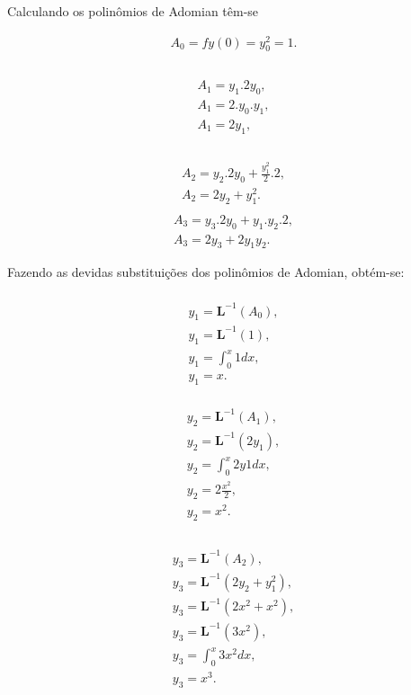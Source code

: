 Calculando os polinômios de Adomian têm-se

\begin{gather*}
  A_{0} = fy(0) = y_{0}^2 = 1.
\end{gather*}
\nonumber\\
\begin{gather*}\nonumber\\
  A_{1} = y_{1}.2y_{0}, \nonumber\\
  A_{1} = 2.y_{0}.y_{1},\nonumber\\
  A_{1} = 2y_{1},\nonumber\\
\end{gather*}\nonumber\\
\begin{gather*}
A_{2} = y_{2}.2y_{0} + \frac{y_{1}^{2}}{2}.2,\nonumber\\
  A_{2} = 2y_{2} + y_{1}^2.\nonumber\\
  \end{gather*}
\begin{gather*}
  A_{3} = y_{3}.2y_{0} + y_{1}.y_{2}.2 ,\nonumber\\
  A_{3} = 2y_{3} + 2y_{1}y_{2}.
 \end{gather*}

Fazendo as devidas substituições dos polinômios de Adomian, obtém-se:

\begin{gather*}\nonumber\\
y_{1} = \textbf{L}^{-1} (A_{0}),\nonumber\\
  y_{1} = \textbf{L}^{-1} (1),\nonumber\\
  y_{1} = \int_0^{x}1dx,\nonumber\\
  y_{1} = x.
\end{gather*}

\begin{gather*}\nonumber\\
y_{2} = \textbf{L}^{-1} (A_{1}),\nonumber\\
  y_{2} = \textbf{L}^{-1}(2y_{1}),\nonumber\\
  y_{2} = \int_0^{x}2y1dx,\nonumber\\
  y_{2} = 2\frac {x^{2}}{2},\nonumber\\
  y_{2} = x^2.\nonumber\\
\end{gather*}


\begin{gather*}\nonumber\\
y_{3} = \textbf{L}^{-1} (A_{2}),\nonumber\\
  y_{3} = \textbf{L}^{-1}(2y_{2} + y_{1}^2),\nonumber\\
  y_{3} = \textbf{L}^{-1}(2x^2 + x^2),\nonumber\\
  y_{3} = \textbf{L}^{-1}(3x^2),\nonumber\\
  y_{3} = \int_0^{x}3x^2dx,\nonumber\\
  y_{3} = x^3.\nonumber\\
\end{gather*}

